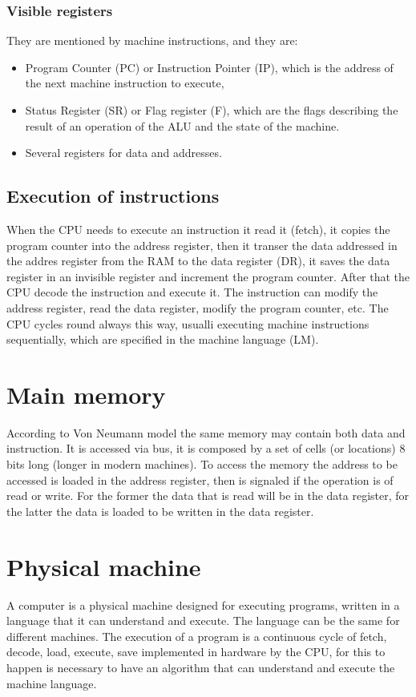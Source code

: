 \subsubsection{Visible registers}
They are mentioned by machine instructions, and they are:
\begin{itemize}
\item Program Counter (PC) or Instruction Pointer (IP), which is the address of the next machine instruction to execute,
\item Status Register (SR) or Flag register (F), which are the flags describing the result of an operation of the ALU and the state of the machine.
\item Several registers for data and addresses.
\end{itemize}
\subsection{Execution of instructions}
When the CPU needs to execute an instruction it read it (fetch), it copies the program counter into the address register, then it transer the data addressed in the addres register 
from the RAM to the data register (DR), it saves the data register in an invisible register and increment the program counter. After that the CPU decode the instruction and execute it. 
The instruction can modify the address register, read the data register, modify the program counter, etc. The CPU cycles round always this way, usualli executing machine instructions 
sequentially, which are specified in the machine language (LM).
\section{Main memory}
According to Von Neumann model the same memory may contain both data and instruction. It is accessed via bus, it is composed by a set of cells (or locations) 8 bits long (longer in modern machines). To access the memory the address to be accessed is loaded in the address register, then is signaled if the operation is of read or write. For the former the data that is read will be in the data register, for the latter the data is loaded to be written in the data register.
\section{Physical machine}
A computer is a physical machine designed for executing programs, written in a language that it can understand and execute. The language can be the same for different machines. The execution of a program is a continuous cycle of fetch, decode, load, execute, save implemented in hardware by the CPU, for this to happen is necessary to have an algorithm that can understand and execute the machine language.
